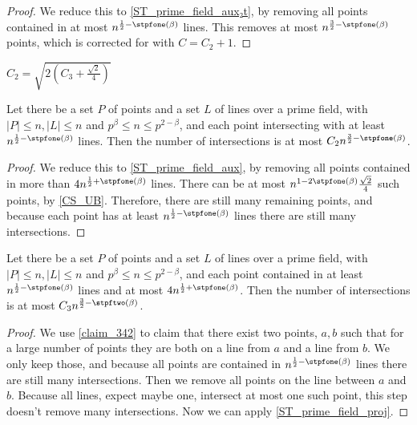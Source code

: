 \begin{proof}
    \leanok
    We reduce this to \ref{ST_prime_field_aux₂t}, by removing all points contained in at most
    $n^{\frac12 - \stpfone(\beta)}$ lines. This removes at most $n^{\frac32 - \stpfone(\beta)}$
    points, which is corrected for with $C = C_2 + 1$.
\end{proof}

\begin{definition}
    \label{ST_C2}
    \leanok
    $C_2 = \sqrt{2(C_3 + \frac{\sqrt2}4)}$
\end{definition}

\begin{theorem}
    \label{ST_prime_field_aux₂t}
    \leanok
    Let there be a set $P$ of points and a set $L$ of lines over a prime field, 
    with $|P| \leq n, |L| \leq n$ and $p^\beta \leq n \leq p^{2 - \beta}$,
    and each point intersecting with at least $n^{\frac12 - \stpfone(\beta)}$ lines.
    Then the number of intersections is at most $C_2 n^{\frac32 - \stpfone(\beta)}$.
\end{theorem}

\begin{proof}
    \leanok
    We reduce this to \ref{ST_prime_field_aux}, by removing all points contained in more than 
    $4 n^{\frac12 + \stpfone(\beta)}$ lines. There can be at most
    $n^{1 - 2 \stpfone(\beta)} \frac{\sqrt2}4$ such points, by \ref{CS_UB}.
    Therefore, there are still many remaining points, and because each point has at least
    $n^{\frac12 - \stpfone(\beta)}$ lines there are still many intersections.
\end{proof}

\begin{theorem}
    \label{ST_prime_field_aux}
    \leanok
    Let there be a set $P$ of points and a set $L$ of lines over a prime field, 
    with $|P| \leq n, |L| \leq n$ and $p^\beta \leq n \leq p^{2 - \beta}$,
    and each point contained in at least $n^{\frac12 - \stpfone(\beta)}$ lines
    and at most $4 n^{\frac12 + \stpfone(\beta)}$.
    Then the number of intersections is at most $C_3 n^{\frac32 - \stpftwo(\beta)}$.
\end{theorem}

\begin{proof}
    \leanok
    We use \ref{claim_342} to claim that there exist two points, $a, b$ such that for a large number of 
    points they are both on a line from $a$ and a line from $b$.
    We only keep those, and because all points are contained in $n^{\frac12 - \stpfone(\beta)}$ lines there are still many intersections.
    Then we remove all points on the line between $a$ and $b$. Because all lines, expect maybe one, intersect at most one such point,
    this step doesn't remove many intersections.
    Now we can apply \ref{ST_prime_field_proj}.
\end{proof}

